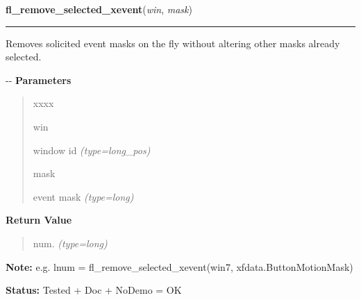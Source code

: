 \hspace{.8\funcindent}\begin{boxedminipage}{\funcwidth}

    \raggedright \textbf{fl\_remove\_selected\_xevent}(\textit{win}, \textit{mask})

    \vspace{-1.5ex}

    \rule{\textwidth}{0.5\fboxrule}
\setlength{\parskip}{2ex}

Removes solicited event masks on the fly without altering other masks
already selected.

-{}-
\setlength{\parskip}{1ex}
      \textbf{Parameters}
      \vspace{-1ex}

      \begin{quote}
        \begin{Ventry}{xxxx}

          \item[win]


window id
            {\it (type=long\_pos)}

          \item[mask]


event mask
            {\it (type=long)}

        \end{Ventry}

      \end{quote}

      \textbf{Return Value}
    \vspace{-1ex}

      \begin{quote}

num.
      {\it (type=long)}

      \end{quote}

\textbf{Note:} 
e.g. lnum = fl\_remove\_selected\_xevent(win7,         xfdata.ButtonMotionMask)


\textbf{Status:} 
Tested + Doc + NoDemo = OK


    \end{boxedminipage}

    \label{xformslib:flxbasic:fl_addto_selected_xevent}

    \vspace{0.5ex}

